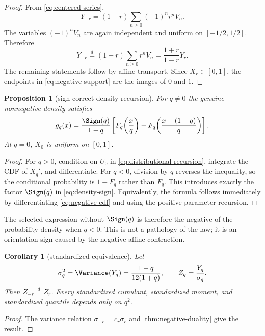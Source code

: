 \documentclass[11pt]{article}
\newtheorem{proposition}[theorem]{Proposition}
\newtheorem{corollary}[theorem]{Corollary}
\theoremstyle{definition}
\theoremstyle{remark}
\begin{document}
\begin{proof}
From \cref{eq:centered-series},
\[
 Y_{-r}=(1+r)\sum_{n\ge0}(-1)^nr^nV_n.
\]
The variables $(-1)^nV_n$ are again independent and uniform on $[-1/2,1/2]$.  Therefore
\[
 Y_{-r}\overset d=(1+r)\sum_{n\ge0}r^nV_n
 =\frac{1+r}{1-r}Y_r.
\]
The remaining statements follow by affine transport.  Since $X_r\in[0,1]$, the endpoints in \cref{eq:negative-support} are the images of $0$ and $1$.
\end{proof}

\begin{proposition}[sign-correct density recursion]\label{prop:density-sign}
For $q\ne0$ the genuine nonnegative density satisfies
\begin{equation}\label{eq:density-sign}
 g_q(x)=\frac{\Sign(q)}{1-q}
 \left[
 F_q\!\left(\frac{x}{q}\right)
 -F_q\!\left(\frac{x-(1-q)}{q}\right)
 \right].
\end{equation}
At $q=0$, $X_0$ is uniform on $[0,1]$.
\end{proposition}

\begin{proof}
For $q>0$, condition on $U_0$ in \cref{eq:distributional-recursion}, integrate the CDF of $X_q'$, and differentiate.  For $q<0$, division by $q$ reverses the inequality, so the conditional probability is $1-F_q$ rather than $F_q$.  This introduces exactly the factor $\Sign(q)$ in \cref{eq:density-sign}.  Equivalently, the formula follows immediately by differentiating \cref{eq:negative-cdf} and using the positive-parameter recursion.
\end{proof}

The selected expression without $\Sign(q)$ is therefore the negative of the probability density when $q<0$.  This is not a pathology of the law; it is an orientation sign caused by the negative affine contraction.

\begin{corollary}[standardized equivalence]\label{cor:standardized-duality}
Let
\begin{equation}\label{eq:sigmaq}
 \sigma_q^2=\Variance(Y_q)=\frac{1-q}{12(1+q)},
 \qquad Z_q=\frac{Y_q}{\sigma_q}.
\end{equation}
Then $Z_{-r}\overset d=Z_r$.  Every standardized cumulant, standardized moment, and standardized quantile depends only on $q^2$.
\end{corollary}

\begin{proof}
The variance relation $\sigma_{-r}=c_r\sigma_r$ and \cref{thm:negative-duality} give the result.
\end{proof}
\end{document}
